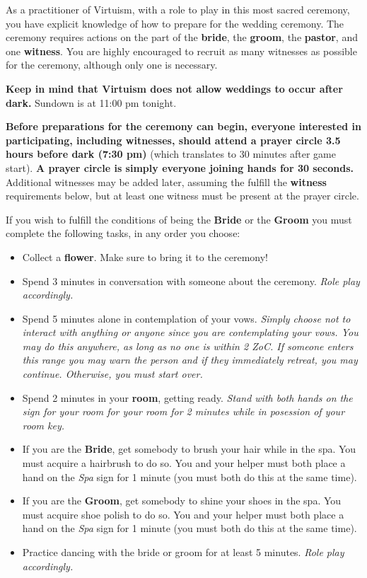 \documentclass[green]{guildcamp1}
\begin{document}
\name{\gPrepareWedding{}}

As a practitioner of Virtuism, with a role to play in this most sacred ceremony, you have explicit knowledge of how to prepare for the wedding ceremony. The ceremony requires actions on the part of the {\bf bride}, the {\bf groom}, the {\bf pastor}, and one {\bf witness}. You are highly encouraged to recruit as many witnesses as possible for the ceremony, although only one is necessary.

{\bf Keep in mind that Virtuism does not allow weddings to occur after dark.} Sundown is at 11:00 pm tonight.

{\bf Before preparations for the ceremony can begin, everyone interested in participating, including witnesses, should attend a prayer circle 3.5 hours before dark (7:30 pm)} (which translates to 30 minutes after game start). {\bf A prayer circle is simply everyone joining hands for 30 seconds.} Additional witnesses may be added later, assuming the fulfill the {\bf witness} requirements below, but at least one witness must be present at the prayer circle.

If you wish to fulfill the conditions of being the {\bf Bride} or the {\bf Groom} you must complete the following tasks, in any order you choose:
\begin{itemize}
  \item Collect a {\bf flower}. Make sure to bring it to the ceremony!
  \item Spend 3 minutes in conversation with someone about the ceremony. {\it Role play accordingly.}
  \item Spend 5 minutes alone in contemplation of your vows. {\it Simply choose not to interact with anything or anyone since you are contemplating your vows. You may do this anywhere, as long as no one is within 2 ZoC. If someone enters this range you may warn the person and if they immediately retreat, you may continue. Otherwise, you must start over.}
  \item Spend 2 minutes in your {\bf room}, getting ready. {\it Stand with both hands on the sign for your room for your room for 2 minutes while in posession of your room key.}
  \item If you are the {\bf Bride}, get somebody to brush your hair while in the spa. You must acquire a hairbrush to do so. You and your helper must both place a hand on the {\em Spa} sign for 1 minute (you must both do this at the same time).
  \item If you are the {\bf Groom}, get somebody to shine your shoes in the spa. You must acquire shoe polish to do so. You and your helper must both place a hand on the {\em Spa} sign for 1 minute (you must both do this at the same time).
  \item Practice dancing with the bride or groom for at least 5 minutes. {\it Role play accordingly.}
\end{itemize}
\end{document}
